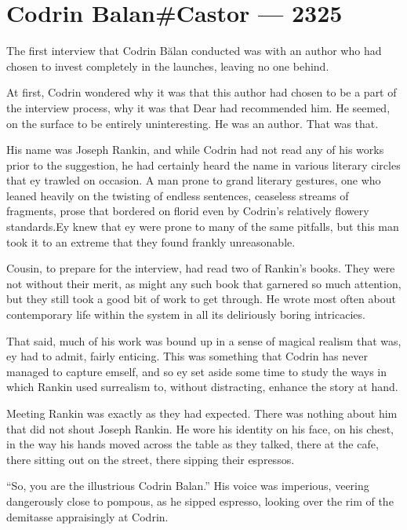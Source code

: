 \hypertarget{codrin-balancastor-2325}{%
\chapter{Codrin Balan\#Castor — 2325}\label{codrin-balancastor-2325}}

The first interview that Codrin Bălan conducted was with an author who had chosen to invest completely in the launches, leaving no one behind.

At first, Codrin wondered why it was that this author had chosen to be a part of the interview process, why it was that Dear had recommended him. He seemed, on the surface to be entirely uninteresting. He was an author. That was that.

His name was Joseph Rankin, and while Codrin had not read any of his works prior to the suggestion, he had certainly heard the name in various literary circles that ey trawled on occasion. A man prone to grand literary gestures, one who leaned heavily on the twisting of endless sentences, ceaseless streams of fragments, prose that bordered on florid even by Codrin's relatively flowery standards.Ey knew that ey were prone to many of the same pitfalls, but this man took it to an extreme that they found frankly unreasonable.

Cousin, to prepare for the interview, had read two of Rankin's books. They were not without their merit, as might any such book that garnered so much attention, but they still took a good bit of work to get through. He wrote most often about contemporary life within the system in all its deliriously boring intricacies.

That said, much of his work was bound up in a sense of magical realism that was, ey had to admit, fairly enticing. This was something that Codrin has never managed to capture emself, and so ey set aside some time to study the ways in which Rankin used surrealism to, without distracting, enhance the story at hand.

Meeting Rankin was exactly as they had expected. There was nothing about him that did not shout Joseph Rankin. He wore his identity on his face, on his chest, in the way his hands moved across the table as they talked, there at the cafe, there sitting out on the street, there sipping their espressos.

``So, you are the illustrious Codrin Balan.'' His voice was imperious, veering dangerously close to pompous, as he sipped espresso, looking over the rim of the demitasse appraisingly at Codrin.

